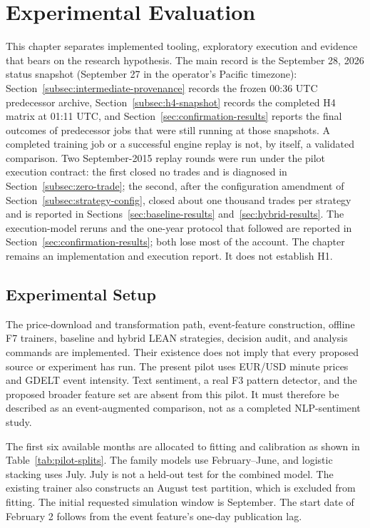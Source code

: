 \chapter{Experimental Evaluation} \label{cap:experimental-evaluation}
\providecommand{\pending}{\textit{pending}}

This chapter separates implemented tooling, exploratory execution and evidence that bears on the research hypothesis. The main record is the September 28, 2026 status snapshot (September 27 in the operator's Pacific timezone): Section~\ref{subsec:intermediate-provenance} records the frozen 00:36 UTC predecessor archive, Section~\ref{subsec:h4-snapshot} records the completed H4 matrix at 01:11 UTC, and Section~\ref{sec:confirmation-results} reports the final outcomes of predecessor jobs that were still running at those snapshots. A completed training job or a successful engine replay is not, by itself, a validated comparison. Two September-2015 replay rounds were run under the pilot execution contract: the first closed no trades and is diagnosed in Section~\ref{subsec:zero-trade}; the second, after the configuration amendment of Section~\ref{subsec:strategy-config}, closed about one thousand trades per strategy and is reported in Sections~\ref{sec:baseline-results} and~\ref{sec:hybrid-results}. The execution-model reruns and the one-year protocol that followed are reported in Section~\ref{sec:confirmation-results}; both lose most of the account. The chapter remains an implementation and execution report. It does not establish H1.

\section{Experimental Setup} \label{sec:experimental-setup}

The price-download and transformation path, event-feature construction, offline F7 trainers, baseline and hybrid LEAN strategies, decision audit, and analysis commands are implemented. Their existence does not imply that every proposed source or experiment has run. The present pilot uses EUR/USD minute prices and GDELT event intensity. Text sentiment, a real F3 pattern detector, and the proposed broader feature set are absent from this pilot. It must therefore be described as an event-augmented comparison, not as a completed NLP-sentiment study.

The first six available months are allocated to fitting and calibration as shown in Table~\ref{tab:pilot-splits}. The family models use February--June, and logistic stacking uses July. July is not a held-out test for the combined model. The existing trainer also constructs an August test partition, which is excluded from fitting. The initial requested simulation window is September. The start date of February 2 follows from the event feature's one-day publication lag.

